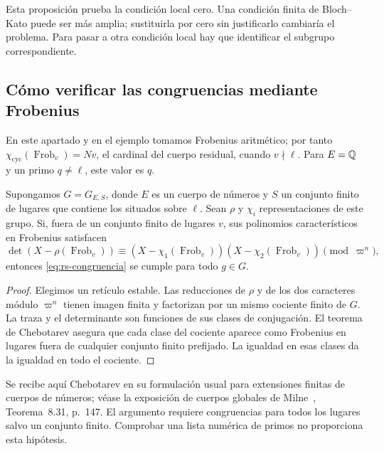 Esta proposición prueba la condición local cero. Una condición
finita de Bloch--Kato puede ser más amplia; sustituirla por cero
sin justificarlo cambiaría el problema. Para pasar a otra
condición local hay que identificar el subgrupo correspondiente.

\subsection{Cómo verificar las congruencias mediante Frobenius}

En este apartado y en el ejemplo tomamos Frobenius aritmético;
por tanto $\chi_{\mathrm{cyc}}(\operatorname{Frob}_v)=Nv$,
el cardinal del cuerpo residual, cuando $v\nmid\ell$.
Para $E=\mathbb{Q}$ y un primo $q\ne\ell$, este valor es $q$.

\begin{proposicion}
\label{prop:rs-frobenius}
Supongamos $G=G_{E,S}$, donde $E$ es un cuerpo de números y $S$
un conjunto finito de lugares que contiene los situados sobre
$\ell$. Sean $\rho$ y $\chi_i$ representaciones de este grupo.
Si, fuera de un conjunto finito de lugares $v$, sus polinomios
característicos en Frobenius satisfacen
\begin{equation}
 \det(X-\rho(\operatorname{Frob}_v))\equiv
 (X-\chi_1(\operatorname{Frob}_v))
 (X-\chi_2(\operatorname{Frob}_v))\pmod{\varpi^n},
 \label{eq:rs-frobenius}
\end{equation}
entonces \eqref{eq:rs-congruencia} se cumple para todo $g\in G$.
\end{proposicion}

\begin{proof}
Elegimos un retículo estable. Las reducciones de $\rho$ y de los
dos caracteres módulo $\varpi^n$ tienen imagen finita y factorizan
por un mismo cociente finito de $G$. La traza y el determinante
son funciones de sus clases de conjugación. El teorema de
Chebotarev asegura que cada clase del cociente aparece como
Frobenius en lugares fuera de cualquier conjunto finito prefijado.
La igualdad en esas clases da la igualdad en todo el cociente.
\end{proof}

Se recibe aquí Chebotarev en su formulación usual para extensiones
finitas de cuerpos de números; véase la exposición de cuerpos
globales de Milne~\cite{milne-ant}, Teorema~8.31, p.~147. El argumento requiere congruencias para todos los lugares
salvo un conjunto finito. Comprobar una lista numérica de primos
no proporciona esta hipótesis.


